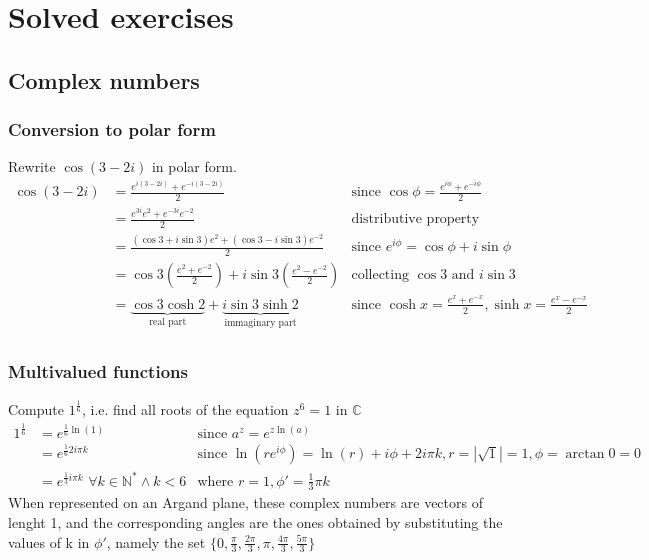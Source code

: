 \chapter{Solved exercises}

\section{Complex numbers}

  \subsection{Conversion to polar form}
  Rewrite $\cos(3-2i)$ in polar form.
  \begin{align*}
    \cos(3-2i) & = \frac{e^{i(3-2i)} + e^{-i(3-2i)}}{2}
               & \text{since }\cos\phi = \frac{e^{i\phi} + e^{-i\phi}}{2} \\
               & = \frac{e^{3i}e^{2} + e^{-3i}e^{-2}}{2}
               & \text{distributive property} \\
               & = \frac{(\cos3 + i\sin3)e^{2} + (\cos3 - i\sin3)e^{-2}}{2}
               & \text{since } e^{i\phi} = \cos\phi + i\sin\phi \\
               & = \cos3\left(\frac{e^2+e^{-2}}{2}\right) + i\sin3\left(\frac{e^2-e^{-2}}{2}\right)
               & \text{collecting } \cos3 \text{ and } i\sin3 \\
               & = \underbrace{\cos3\cosh2}_{\text{real part}} + \underbrace{i\sin3\sinh2}_{\text{immaginary part}}
               & \text{since } \cosh x = \frac{e^x+e^{-x}}{2}, \sinh x = \frac{e^x-e^{-x}}{2} \\
  \end{align*}

  \subsection{Multivalued functions}
  Compute $1^{\frac{1}{6}}$, i.e. find all roots of the equation $z^{6} = 1$ in $\mathbb{C}$
  \begin{align*}
    1^{\frac{1}{6}} & = e^{\frac{1}{6}\ln(1)}
                    & \text{since } a^z = e^{z\ln(a)}\\
                    & = e^{\frac{1}{6}2i\pi k}
                    & \text{since } \ln(re^{i\phi}) = \ln(r) + i\phi + 2i\pi k, 
                                    r = |\sqrt1| = 1, 
                                    \phi = \arctan{0} = 0\\
                    & = e^{\frac{1}{3}i\pi k} \,\,\forall k \in \mathbb{N}^* \wedge k < 6
                    & \text{where } r = 1, \phi' = \frac{1}{3} \pi k
  \end{align*}
  When represented on an Argand plane, these complex numbers are vectors of lenght 1, and the corresponding angles are the ones obtained by substituting the values of k in $\phi'$, namely the set $\{0, \frac{\pi}{3}, \frac{2\pi}{3}, \pi, \frac{4\pi}{3}, \frac{5\pi}{3}\}$


